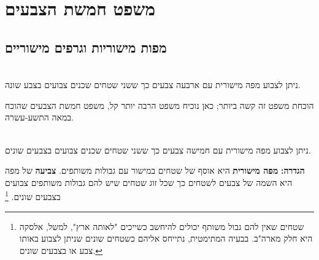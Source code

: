 


\chapter{משפט חמשת הצבעים}
\label{c.five}


\section{מפות מישוריות וגרפים מישוריים}\label{s.planar}

\begin{theorem}\mbox{}\\
ניתן לצבוע מפה מישורית עם ארבעה צבעים כך ששני שטחים שכנים צבועים בצבע שונה.
\end{theorem}

הוכחת משפט זה קשה ביותר; כאן נוכיח משפט הרבה יותר קל, משפט חמשת הצבעים שהוכח במאה התשע-עשרה.

\begin{theorem}\mbox{}\\
ניתן לצבוע מפה מישורית עם חמישה צבעים כך ששני שטחים שכנים צבועים בצבעים שונים.
\end{theorem}

\textbf{הגדרה:}
\textbf{מפה מישורית}
היא אוסף של שטחים במישור עם גבולות משותפים.
\textbf{צביעה}
של מפה היא השמה של צבעים לשטחים כך שכל זוג שטחים שיש להם גבולות  משותפים צבועים בצבעים שונים.%
\footnote{%
שטחים שאין להם גבול משותף יכולים להיחשב כשייכים "לאותה ארץ", למשל, אלסקה היא חלק מארה"ב. בבעיה המתימטית, נתייחס אליהם  כשטחים שונים שניתן לצבוע באותו צבע או בצבעים שונים.%
}

